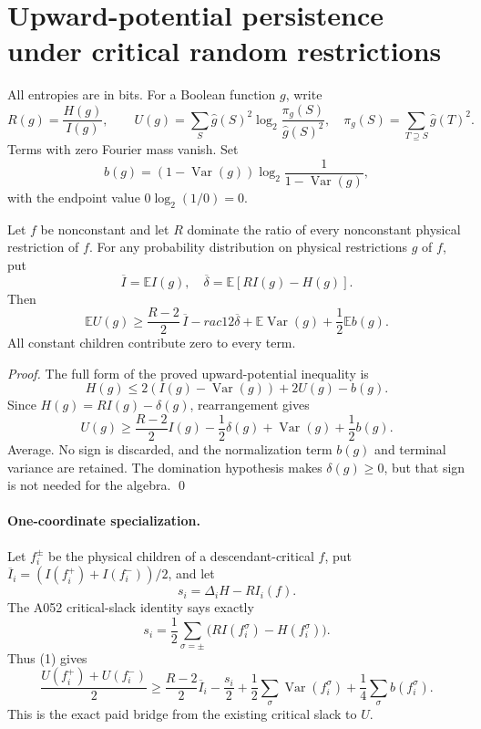 \section*{Upward-potential persistence under critical random restrictions}

All entropies are in bits.  For a Boolean function $g$, write
\[
 R(g)=\frac{H(g)}{I(g)},\qquad
 U(g)=\sum_S \widehat g(S)^2\log_2\frac{\pi_g(S)}{\widehat g(S)^2},
 \quad \pi_g(S)=\sum_{T\supseteq S}\widehat g(T)^2.
\]
Terms with zero Fourier mass vanish.  Set
\[
 b(g)=(1-\operatorname{Var}(g))
       \log_2\frac1{1-\operatorname{Var}(g)},
\]
with the endpoint value $0\log_2(1/0)=0$.

\begin{theorem}
Let $f$ be nonconstant and let $R$ dominate the ratio of every nonconstant
physical restriction of $f$.  For any probability distribution on physical
restrictions $g$ of $f$, put
\[
 \overline I=\mathbb E I(g),\quad
 \overline\delta=\mathbb E[RI(g)-H(g)].
\]
Then
\[
 \boxed{\quad
 \mathbb E U(g)\ge
 \frac{R-2}{2}\,\overline I-rac12\overline\delta
 +\mathbb E\operatorname{Var}(g)+\frac12\mathbb E b(g).
 \quad}                                                   \tag{1}
\]
All constant children contribute zero to every term.
\end{theorem}

\begin{proof}
The full form of the proved upward-potential inequality is
\[
 H(g)\le2(I(g)-\operatorname{Var}(g))+2U(g)-b(g).
\]
Since $H(g)=RI(g)-\delta(g)$, rearrangement gives
\[
 U(g)\ge \frac{R-2}{2}I(g)-\frac12\delta(g)
          +\operatorname{Var}(g)+\frac12b(g).
\]
Average.  No sign is discarded, and the normalization term $b(g)$ and
terminal variance are retained.  The domination hypothesis makes
$\delta(g)\ge0$, but that sign is not needed for the algebra.  \qed
\end{proof}

\paragraph{One-coordinate specialization.}
Let $f_i^\pm$ be the physical children of a descendant-critical $f$, put
$\overline I_i=(I(f_i^+)+I(f_i^-))/2$, and let
\[
 s_i=\Delta_iH-RI_i(f).
\]
The A052 critical-slack identity says exactly
\[
 s_i=\frac12\sum_{\sigma=\pm}
       \bigl(RI(f_i^\sigma)-H(f_i^\sigma)\bigr).
\]
Thus (1) gives
\[
 \frac{U(f_i^+)+U(f_i^-)}2\ge
 \frac{R-2}{2}\overline I_i-\frac{s_i}{2}
 +\frac12\sum_\sigma\operatorname{Var}(f_i^\sigma)
 +\frac14\sum_\sigma b(f_i^\sigma).                       \tag{2}
\]
This is the exact paid bridge from the existing critical slack to $U$.

